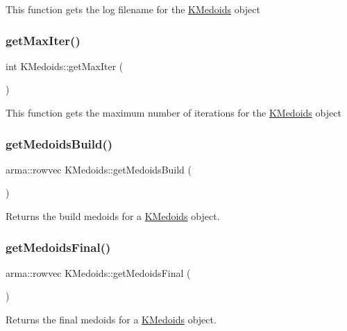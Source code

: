 This function gets the log filename for the \hyperlink{classKMedoids}{K\+Medoids} object \mbox{\label{classKMedoids_ac0569206113015abb38954f78a194eb5}} 
\subsubsection{\texorpdfstring{get\+Max\+Iter()}{getMaxIter()}}
{\footnotesize\ttfamily int K\+Medoids\+::get\+Max\+Iter (\begin{DoxyParamCaption}{ }\end{DoxyParamCaption})}

This function gets the maximum number of iterations for the \hyperlink{classKMedoids}{K\+Medoids} object \mbox{\label{classKMedoids_a54370d8d0f5c500f5deb859a9eab891c}} 
\subsubsection{\texorpdfstring{get\+Medoids\+Build()}{getMedoidsBuild()}}
{\footnotesize\ttfamily arma\+::rowvec K\+Medoids\+::get\+Medoids\+Build (\begin{DoxyParamCaption}{ }\end{DoxyParamCaption})}

Returns the build medoids for a \hyperlink{classKMedoids}{K\+Medoids} object. \mbox{\label{classKMedoids_a26aa9827d2541626d959dc984f0f9bcb}} 
\subsubsection{\texorpdfstring{get\+Medoids\+Final()}{getMedoidsFinal()}}
{\footnotesize\ttfamily arma\+::rowvec K\+Medoids\+::get\+Medoids\+Final (\begin{DoxyParamCaption}{ }\end{DoxyParamCaption})}

Returns the final medoids for a \hyperlink{classKMedoids}{K\+Medoids} object. \mbox{\label{classKMedoids_ad738dc6b5a2dafa1ff4aeab807d6407d}} 

